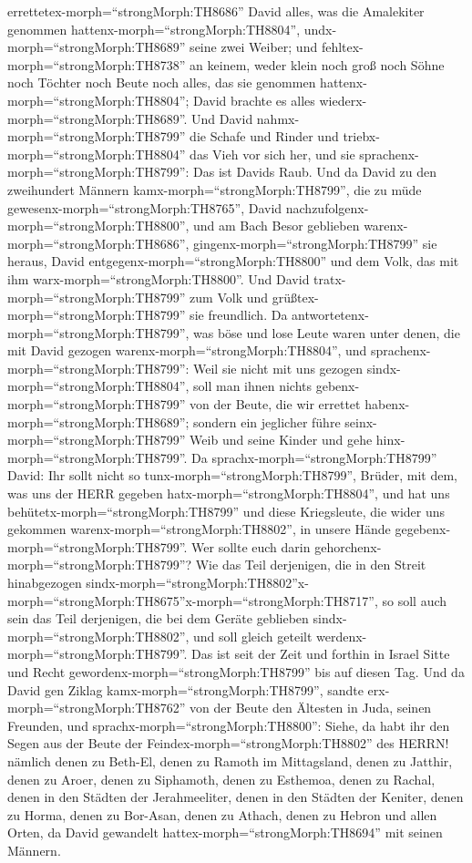 errettetex-morph=``strongMorph:TH8686'' David alles, was die Amalekiter
genommen hattenx-morph=``strongMorph:TH8804'',
undx-morph=``strongMorph:TH8689'' seine zwei Weiber;  und
fehltex-morph=``strongMorph:TH8738'' an keinem, weder klein noch groß
noch Söhne noch Töchter noch Beute noch alles, das sie genommen
hattenx-morph=``strongMorph:TH8804''; David brachte es alles
wiederx-morph=``strongMorph:TH8689''.  Und David
nahmx-morph=``strongMorph:TH8799'' die Schafe und Rinder und
triebx-morph=``strongMorph:TH8804'' das Vieh vor sich her, und sie
sprachenx-morph=``strongMorph:TH8799'': Das ist Davids Raub.
 Und da David zu den zweihundert Männern
kamx-morph=``strongMorph:TH8799'', die zu müde
gewesenx-morph=``strongMorph:TH8765'', David
nachzufolgenx-morph=``strongMorph:TH8800'', und am Bach Besor geblieben
warenx-morph=``strongMorph:TH8686'',
gingenx-morph=``strongMorph:TH8799'' sie heraus, David
entgegenx-morph=``strongMorph:TH8800'' und dem Volk, das mit ihm
warx-morph=``strongMorph:TH8800''. Und David
tratx-morph=``strongMorph:TH8799'' zum Volk und
grüßtex-morph=``strongMorph:TH8799'' sie freundlich.  Da
antwortetenx-morph=``strongMorph:TH8799'', was böse und lose Leute waren
unter denen, die mit David gezogen warenx-morph=``strongMorph:TH8804'',
und sprachenx-morph=``strongMorph:TH8799'': Weil sie nicht mit uns
gezogen sindx-morph=``strongMorph:TH8804'', soll man ihnen nichts
gebenx-morph=``strongMorph:TH8799'' von der Beute, die wir errettet
habenx-morph=``strongMorph:TH8689''; sondern ein jeglicher führe
seinx-morph=``strongMorph:TH8799'' Weib und seine Kinder und gehe
hinx-morph=``strongMorph:TH8799''.  Da
sprachx-morph=``strongMorph:TH8799'' David: Ihr sollt nicht so
tunx-morph=``strongMorph:TH8799'', Brüder, mit dem, was uns der HERR
gegeben hatx-morph=``strongMorph:TH8804'', und hat uns
behütetx-morph=``strongMorph:TH8799'' und diese Kriegsleute, die wider
uns gekommen warenx-morph=``strongMorph:TH8802'', in unsere Hände
gegebenx-morph=``strongMorph:TH8799''.  Wer sollte euch
darin gehorchenx-morph=``strongMorph:TH8799''? Wie das Teil derjenigen,
die in den Streit hinabgezogen
sindx-morph=``strongMorph:TH8802''\textbar x-morph=``strongMorph:TH8675''x-morph=``strongMorph:TH8717'',
so soll auch sein das Teil derjenigen, die bei dem Geräte geblieben
sindx-morph=``strongMorph:TH8802'', und soll gleich geteilt
werdenx-morph=``strongMorph:TH8799''.  Das ist seit der
Zeit und forthin in Israel Sitte und Recht
gewordenx-morph=``strongMorph:TH8799'' bis auf diesen Tag. 
Und da David gen Ziklag kamx-morph=``strongMorph:TH8799'', sandte
erx-morph=``strongMorph:TH8762'' von der Beute den Ältesten in Juda,
seinen Freunden, und sprachx-morph=``strongMorph:TH8800'': Siehe, da
habt ihr den Segen aus der Beute der
Feindex-morph=``strongMorph:TH8802'' des HERRN!  nämlich
denen zu Beth-El, denen zu Ramoth im Mittagsland, denen zu Jatthir,
 denen zu Aroer, denen zu Siphamoth, denen zu Esthemoa,
 denen zu Rachal, denen in den Städten der Jerahmeeliter,
denen in den Städten der Keniter,  denen zu Horma, denen zu
Bor-Asan, denen zu Athach,  denen zu Hebron und allen
Orten, da David gewandelt hattex-morph=``strongMorph:TH8694'' mit seinen
Männern.

